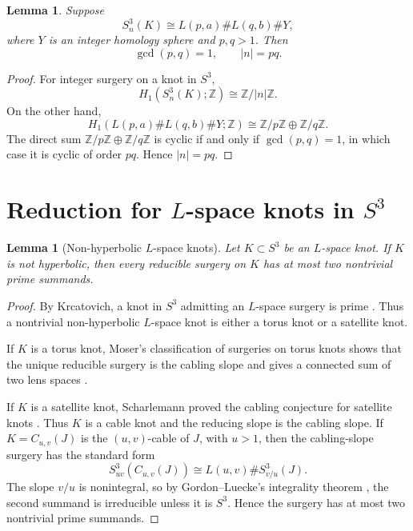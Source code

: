 \documentclass[11pt]{article}
\newtheorem{lemma}[theorem]{Lemma}
\theoremstyle{definition}
\theoremstyle{remark}
\newcommand{\Z}{\mathbb Z}
\begin{document}
\begin{lemma}\label{lem:homology}
Suppose
\[
        S^{3}_{n}(K)\cong L(p,a)\#L(q,b)\#Y,
\]
where \(Y\) is an integer homology sphere and \(p,q>1\).  Then
\[
        \gcd(p,q)=1,\qquad |n|=pq .
\]
\end{lemma}

\begin{proof}
For integer surgery on a knot in \(S^{3}\),
\[
        H_{1}(S^{3}_{n}(K);\Z)\cong \Z/|n|\Z .
\]
On the other hand,
\[
        H_{1}(L(p,a)\#L(q,b)\#Y;\Z)
        \cong \Z/p\Z\oplus \Z/q\Z .
\]
The direct sum \(\Z/p\Z\oplus \Z/q\Z\) is cyclic if and only if
\(\gcd(p,q)=1\), in which case it is cyclic of order \(pq\).  Hence
\(|n|=pq\).
\end{proof}

\section{Reduction for \(L\)-space knots in \(S^{3}\)}

\begin{lemma}[Non-hyperbolic \(L\)-space knots]\label{lem:nonhyp}
Let \(K\subset S^{3}\) be an \(L\)-space knot.  If \(K\) is not hyperbolic,
then every reducible surgery on \(K\) has at most two nontrivial prime
summands.
\end{lemma}

\begin{proof}
By Krcatovich, a knot in \(S^{3}\) admitting an \(L\)-space surgery is prime
\cite[Theorem 1.2]{Krcatovich}.  Thus a nontrivial non-hyperbolic \(L\)-space
knot is either a torus knot or a satellite knot.

If \(K\) is a torus knot, Moser's classification of surgeries on torus knots
shows that the unique reducible surgery is the cabling slope and gives a
connected sum of two lens spaces \cite{Moser}.

If \(K\) is a satellite knot, Scharlemann proved the cabling conjecture for
satellite knots \cite{Scharlemann}.  Thus \(K\) is a cable knot and the
reducing slope is the cabling slope.  If \(K=C_{u,v}(J)\) is the
\((u,v)\)-cable of \(J\), with \(u>1\), then the cabling-slope surgery has
the standard form
\[
        S^{3}_{uv}(C_{u,v}(J))
        \cong L(u,v)\# S^{3}_{v/u}(J).
\]
The slope \(v/u\) is nonintegral, so by Gordon--Luecke's integrality theorem
\cite{GLIntegral}, the second summand is irreducible unless it is \(S^{3}\).
Hence the surgery has at most two nontrivial prime summands.
\end{proof}
\end{document}

